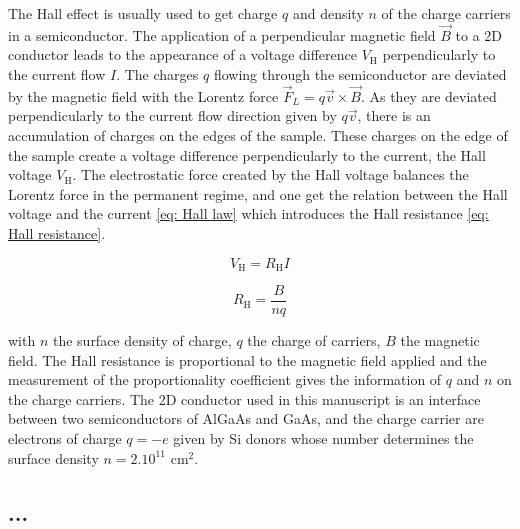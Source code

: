 The Hall effect is usually used to get charge $q$ and density $n$ of the charge carriers in a semiconductor.
The application of a perpendicular magnetic field $\vec{B}$ to a 2D conductor leads to the appearance of a voltage difference $V_{\mathrm{H}}$ perpendicularly to the current flow $I$.
The charges $q$ flowing through the semiconductor are deviated by the magnetic field with the Lorentz force $\vec{F}_L = q\vec{v}\times\vec{B}$.
As they are deviated perpendicularly to the current flow direction given by $q\vec{v}$, there is an accumulation of charges on the edges of the sample.
These charges on the edge of the sample create a voltage difference perpendicularly to the current, the Hall voltage $V_{\mathrm{H}}$.
The electrostatic force created by the Hall voltage balances the Lorentz force in the permanent regime, and one get the relation between the Hall voltage and the current \eqref{eq: Hall law} which introduces the Hall resistance \eqref{eq: Hall resistance}.

\begin{equation}
V_{\mathrm{H}} = R_{\mathrm{H}}I \label{eq: Hall law}
\end{equation}

\begin{equation}
R_{\mathrm{H}} = \frac{B}{nq} \label{eq: Hall resistance}
\end{equation}

with $n$ the surface density of charge, $q$ the charge of carriers, $B$ the magnetic field.
The Hall resistance is proportional to the magnetic field applied and the measurement of the proportionality coefficient gives the information of $q$ and $n$ on the charge carriers.
The 2D conductor used in this manuscript is an interface between two semiconductors of AlGaAs and GaAs, and the charge carrier are electrons of charge $q = -e$ given by Si donors whose number determines the surface density $n = 2.10^{11}$ cm$^{2}$.

\subsection{\texorpdfstring{...}{...}}



